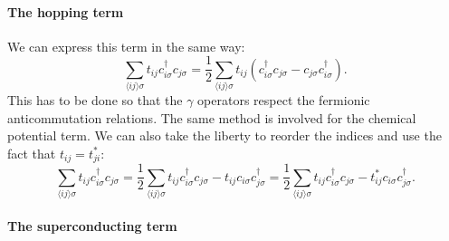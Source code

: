 \documentclass[../main.tex]{subfile}
\begin{document}
\paragraph{The hopping term} $~$\\
We can express this term in the same way:
\[
    \sum_{\langle ij\rangle\sigma} t_{ij} c_{i\sigma}^{\dagger} c_{j\sigma} = \frac{1}{2}\sum_{\langle ij\rangle \sigma} t_{ij} \left(c_{i\sigma}^{\dagger}c_{j\sigma} - c_{j\sigma}c_{i\sigma}^{\dagger}\right).
\]
This has to be done so that the $\gamma$ operators respect the fermionic anticommutation relations. The same method is involved for the chemical potential term.
We can also take the liberty to reorder the indices and use the fact that $t_{ij} = t_{ji}^{\ast}$:
\begin{equation}\label{eq:SymHam_tij}
    \sum_{\langle ij\rangle\sigma} t_{ij} c_{i\sigma}^{\dagger} c_{j\sigma} = \frac{1}{2}\sum_{\langle ij\rangle \sigma} t_{ij}c_{i\sigma}^{\dagger}c_{j\sigma} - t_{ij}c_{i\sigma}c_{j\sigma}^{\dagger} = \frac{1}{2}\sum_{\langle ij\rangle \sigma} t_{ij}c_{i\sigma}^{\dagger}c_{j\sigma} - t_{ij}^{\ast}c_{i\sigma}c_{j\sigma}^{\dagger}.
\end{equation}
\paragraph{The superconducting term}$~$\\ 
\end{document}
